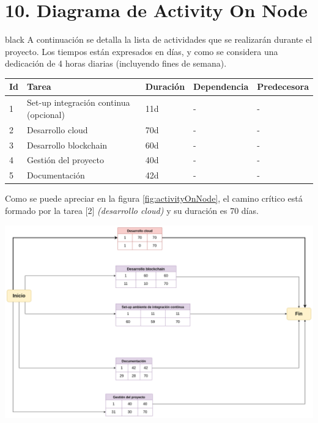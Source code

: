 \documentclass[
11pt, %
]{charter}
\begin{document}
\section{10. Diagrama de Activity On Node}
\label{sec:AoN}

\begin{consigna}{black}
A continuación se detalla la lista de actividades que se realizarán durante el proyecto. Los tiempos están expresados en días, y como se considera una dedicación de 4 horas diarias (incluyendo fines de semana).

\begin{table}[ht]
\begin{tabularx}{\linewidth}{@{}|l|X|l|l|l|@{}}
\hline
\rowcolor[HTML]{C0C0C0}
Id	& Tarea           						& Duración 	& Dependencia	& Predecesora 	\\ \hline
1	& Set-up integración continua (opcional)	& 11d  		& -        		&  -				\\ \hline
2	& Desarrollo cloud						& 70d		& -				&  -      		\\ \hline
3	& Desarrollo blockchain    				& 60d			& -			 	& -			\\ \hline
4	& Gestión del proyecto 					& 40d		& -				&  - 			\\ \hline
5	& Documentación    						& 42d		& -			 	& -				\\ \hline

\end{tabularx}
\end{table}

Como se puede apreciar en la figura \ref{fig:activityOnNode}, el camino crítico está formado por la tarea [2] \textit{(desarrollo cloud)} y su duración es 70 días.

\begin{center}
  \includegraphics[scale=0.30]{./Figuras/activity-on-node}
  \label{fig:activityOnNode}
\end{center}

\end{consigna}
\end{document}
